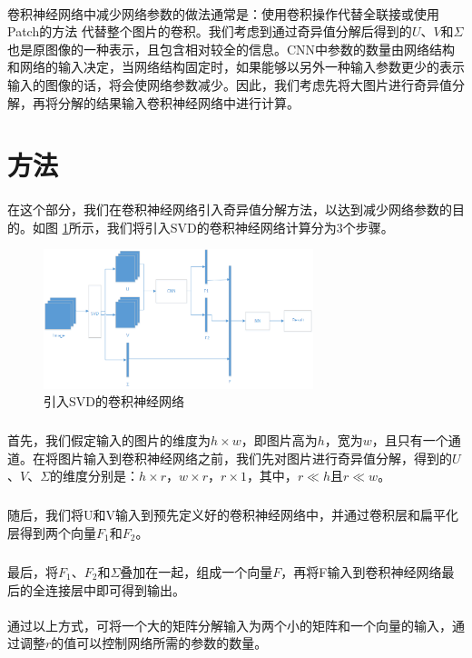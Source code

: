 \documentclass[12pt,a4paper]{article}
\begin{document}
\paragraph{} 卷积神经网络中减少网络参数的做法通常是：使用卷积操作代替全联接或使用Patch的方法\cite{pix2pix} 代替整个图片的卷积。我们考虑到通过奇异值分解后得到的$U$、$V$和$\Sigma$也是原图像的一种表示，且包含相对较全的信息。CNN中参数的数量由网络结构和网络的输入决定，当网络结构固定时，如果能够以另外一种输入参数更少的表示输入的图像的话，将会使网络参数减少。因此，我们考虑先将大图片进行奇异值分解，再将分解的结果输入卷积神经网络中进行计算。

\section{方法}
\paragraph{} 在这个部分，我们在卷积神经网络引入奇异值分解方法，以达到减少网络参数的目的。如图 \ref{Fig.model}所示，我们将引入SVD的卷积神经网络计算分为3个步骤。
\begin{figure}[H]
		\centering
		\includegraphics[width=0.7\textwidth]{../images/svd-cnn-arch.png}
		\caption{引入SVD的卷积神经网络}
		\label{Fig.model}
	\end{figure}
	
	\subparagraph{} 首先，我们假定输入的图片的维度为$h\times w$，即图片高为$h$，宽为$w$，且只有一个通道。在将图片输入到卷积神经网络之前，我们先对图片进行奇异值分解，得到的$U$、$V$、$\Sigma$的维度分别是：$h\times r$，$w \times r$，$r\times 1$，其中，$r \ll h$且$r \ll w$。
	\subparagraph{} 随后，我们将U和V输入到预先定义好的卷积神经网络中，并通过卷积层和扁平化层得到两个向量$F_1$和$F_2$。
	\subparagraph{} 最后，将$F_1$、$F_2$和$\Sigma$叠加在一起，组成一个向量$F$，再将F输入到卷积神经网络最后的全连接层中即可得到输出。
\paragraph{} 通过以上方式，可将一个大的矩阵分解输入为两个小的矩阵和一个向量的输入，通过调整$r$的值可以控制网络所需的参数的数量。
\end{document}
